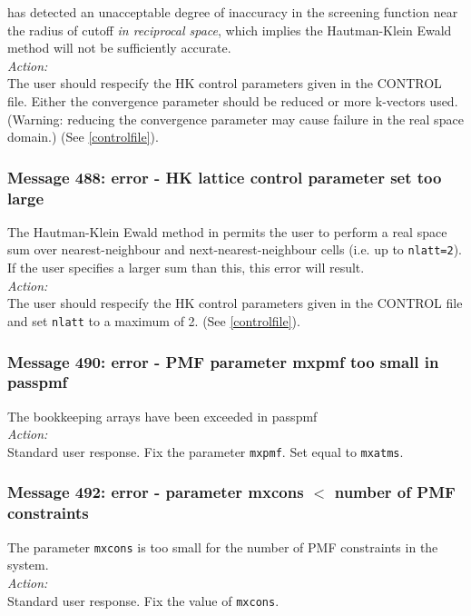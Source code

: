 \D{} has detected an unacceptable degree of inaccuracy in the screening
function near the radius of cutoff {\em in reciprocal space}, which
implies the Hautman-Klein Ewald method will not be sufficiently
accurate. \\

\noindent
{\em Action:} \\ The user should respecify the HK control parameters
given in the CONTROL file. Either the convergence parameter should be
reduced or more k-vectors used. (Warning: reducing the convergence
parameter may cause failure in the real space domain.) (See \ref{controlfile}).

\subsubsection*{Message 488: error - HK lattice control parameter set too large}

The Hautman-Klein Ewald method in \D{} permits the user to perform a
real space sum over nearest-neighbour and next-nearest-neighbour cells
(i.e. up to {\tt nlatt=2}). If the user specifies a larger sum than
this, this error will result.\\

\noindent
{\em Action:} \\ The user should respecify the HK control parameters
given in the CONTROL file and set {\tt nlatt} to a maximum of 2.
(See \ref{controlfile}).

\subsubsection*{Message 490: error - PMF parameter mxpmf too small in 
passpmf}

The bookkeeping arrays have been exceeded in {\sc passpmf}\\

\noindent
{\em Action:} \\
Standard user response. Fix the parameter {\tt mxpmf}. Set equal to
{\tt mxatms}.

\subsubsection*{Message 492: error - parameter mxcons $<$ number of PMF
constraints} 
The parameter {\tt mxcons} is too small for the number of PMF constraints in the system.\\

\noindent
{\em Action:} \\
Standard user response. Fix the value of {\tt mxcons}.

